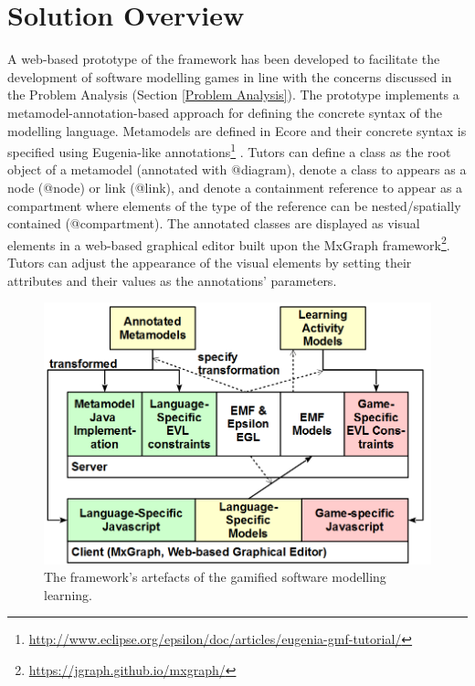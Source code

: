\documentclass[conference]{IEEEtran}
\begin{document}
\section{Solution Overview}
\label{Solution Overview}
A web-based prototype of the framework has been developed to facilitate the development of software modelling games in line with the concerns discussed in the Problem Analysis (Section \ref{Problem Analysis}). The prototype implements a metamodel-annotation-based approach for defining the concrete syntax of the modelling language. Metamodels are defined in Ecore \cite{steinberg2008emf} and their concrete syntax is specified using Eugenia-like annotations\footnote{\url{http://www.eclipse.org/epsilon/doc/articles/eugenia-gmf-tutorial/}} \cite{kolovos2015eugenia}. Tutors can define a class as the root object of a metamodel (annotated with {\selectfont @diagram}), denote a class to appears as a node ({\selectfont @node}) or link ({\selectfont @link}), and denote a containment reference to appear as a compartment where elements of the type of the reference can be nested/spatially contained ({\selectfont @compartment}). The annotated classes are displayed as visual elements in a web-based graphical editor built upon the MxGraph framework\footnote{\url{https://jgraph.github.io/mxgraph/}}. Tutors can adjust the appearance of the visual elements by setting their attributes and their values as the annotations' parameters.

\begin{figure}[t!]
\centering
\includegraphics[width=\linewidth]{artefacts}
\caption{The framework's artefacts of the gamified software modelling learning.}
\label{artefacts}
\end{figure}
\end{document}
